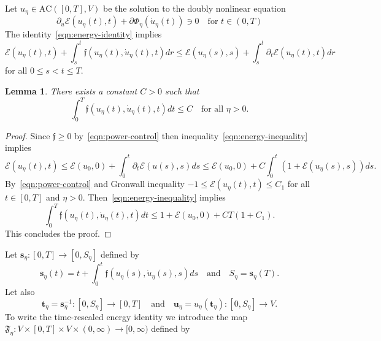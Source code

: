 \documentclass[letterpaper,oneside]{amsart}
\numberwithin{equation}{section}
\newtheorem{lemma}[theorem]{Lemma}
\theoremstyle{definition}
\begin{document}
Let $u_\eta\in\text{AC}([0,T],V)$ be the solution to the doubly nonlinear equation
\begin{equation*}
\partial_u\mathcal{E}(u_\eta(t),t)+\partial\Phi_\eta(\dot u_\eta(t))\ni0\quad\text{for $t\in(0,T)$}
\end{equation*}
The identity~\eqref{eqn:energy-identity} implies
\begin{equation}
\label{eqn:energy-inequality}
\mathcal{E}(u_\eta(t),t)+\int_s^t\mathfrak{f}(u_\eta(t),\dot u_\eta(t),t)dr\le\mathcal{E}(u_\eta(s),s)+\int_s^t\partial_t\mathcal{E}(u_\eta(t),t)dr
\end{equation}
for all $0\le s<t\le T$.
\begin{lemma}
\label{lemma:dissipation-bound}
There exists a constant $C>0$ such that
\begin{equation*}
\int_0^T\mathfrak{f}(u_\eta(t),\dot u_\eta(t),t)dt\le C\quad\text{for all $\eta>0$}.
\end{equation*}
\end{lemma}
\begin{proof}
Since $\mathfrak{f}\ge0$ by~\eqref{eqn:power-control} then inequality~\eqref{eqn:energy-inequality} implies
\begin{equation*}
\mathcal{E}(u_\eta(t),t)\le\mathcal{E}(u_0,0)+\int_0^t\partial_t\mathcal{E}(u(s),s)ds\le\mathcal{E}(u_0,0)+C\int_0^t(1+\mathcal{E}(u_\eta(s),s))ds.
\end{equation*}
By~\eqref{eqn:power-control} and Gronwall inequality $-1\le\mathcal{E}(u_\eta(t),t)\le C_1$ for all $t\in[0,T]$ and $\eta>0$. Then~\eqref{eqn:energy-inequality} implies
\begin{equation*}
\int_0^T\mathfrak{f}(u_\eta(t),\dot u_\eta(t),t)dt\le1+\mathcal{E}(u_0,0)+CT(1+C_1).
\end{equation*}
This concludes the proof.
\end{proof}
Let $\boldsymbol{s}_\eta\colon[0,T]\to[0,S_\eta]$ defined by
\begin{equation}
\label{eqn:energy-arc-lenght}
\boldsymbol{s}_\eta(t)=t+\int_0^t\mathfrak{f}(u_\eta(s),\dot u_\eta(s),s)ds\quad\text{and}\quad S_\eta=\boldsymbol{s}_\eta(T).
\end{equation}
Let also
\begin{equation*}
\boldsymbol{t}_\eta=\boldsymbol{s}_\eta^{-1}\colon[0,S_\eta]\to[0,T]\quad\text{and}\quad\boldsymbol{u}_\eta=u_\eta(\boldsymbol{t}_\eta)\colon[0,S_\eta]\to V.
\end{equation*}
To write the time-rescaled energy identity we introduce the map $\mathfrak{F}_\eta\colon V\times[0,T]\times V\times(0,\infty)\to[0,\infty)$ defined by
\end{document}
